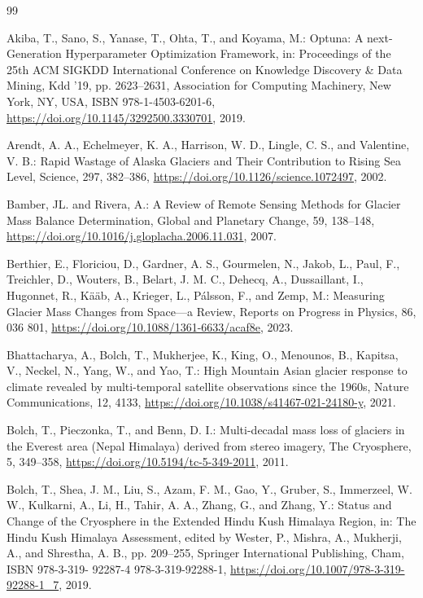 \begin{thebibliography}{99}

 Akiba, T., Sano, S., Yanase, T., Ohta, T., and Koyama, M.: Optuna: A next-Generation Hyperparameter Optimization Framework, in: Proceedings of the 25th ACM SIGKDD International Conference on Knowledge Discovery \& Data Mining, Kdd ’19, pp. 2623–2631, Association for Computing Machinery, New York, NY, USA, ISBN 978-1-4503-6201-6, \url{https://doi.org/10.1145/3292500.3330701}, 2019.

 Arendt, A. A., Echelmeyer, K. A., Harrison, W. D., Lingle, C. S., and Valentine, V. B.: Rapid Wastage of Alaska Glaciers and Their Contribution to Rising Sea Level, Science, 297, 382–386, \url{https://doi.org/10.1126/science.1072497}, 2002.

 Bamber, JL. and Rivera, A.: A Review of Remote Sensing Methods for Glacier Mass Balance Determination, Global and Planetary Change, 59, 138–148, \url{https://doi.org/10.1016/j.gloplacha.2006.11.031}, 2007.

 Berthier, E., Floriciou, D., Gardner, A. S., Gourmelen, N., Jakob, L., Paul, F., Treichler, D., Wouters, B., Belart, J. M. C., Dehecq, A., Dussaillant, I., Hugonnet, R., Kääb, A., Krieger, L., Pálsson, F., and Zemp, M.: Measuring Glacier Mass Changes from Space—a Review, Reports on Progress in Physics, 86, 036 801, \url{https://doi.org/10.1088/1361-6633/acaf8e}, 2023.

 Bhattacharya, A., Bolch, T., Mukherjee, K., King, O., Menounos, B., Kapitsa, V., Neckel, N., Yang, W., and Yao, T.: High Mountain Asian glacier response to climate revealed by multi-temporal satellite observations since the 1960s, Nature Communications, 12, 4133, \url{https://doi.org/10.1038/s41467-021-24180-y}, 2021.

 Bolch, T., Pieczonka, T., and Benn, D. I.: Multi-decadal mass loss of glaciers in the Everest area (Nepal Himalaya) derived from stereo imagery, The Cryosphere, 5, 349–358, \url{https://doi.org/10.5194/tc-5-349-2011}, 2011.

 Bolch, T., Shea, J. M., Liu, S., Azam, F. M., Gao, Y., Gruber, S., Immerzeel, W. W., Kulkarni, A., Li, H., Tahir, A. A., Zhang, G., and Zhang, Y.: Status and Change of the Cryosphere in the Extended Hindu Kush Himalaya Region, in: The Hindu Kush Himalaya Assessment, edited by Wester, P., Mishra, A., Mukherji, A., and Shrestha, A. B., pp. 209–255, Springer International Publishing, Cham, ISBN 978-3-319- 92287-4 978-3-319-92288-1, \url{https://doi.org/10.1007/978-3-319-92288-1_7}, 2019.


\end{thebibliography}
